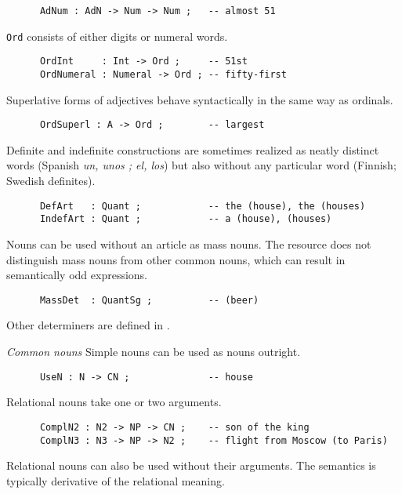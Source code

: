 \documentclass[11pt,a4paper]{article}
\newcommand{\subsubsubsection}[1]{\textit{#1}}
\begin{document}
\begin{verbatim}
      AdNum : AdN -> Num -> Num ;   -- almost 51
\end{verbatim}

\texttt{Ord} consists of either digits or numeral words.

\begin{verbatim}
      OrdInt     : Int -> Ord ;     -- 51st
      OrdNumeral : Numeral -> Ord ; -- fifty-first
\end{verbatim}

Superlative forms of adjectives behave syntactically in the same way as
ordinals.

\begin{verbatim}
      OrdSuperl : A -> Ord ;        -- largest
\end{verbatim}

Definite and indefinite constructions are sometimes realized as
neatly distinct words (Spanish \textit{un, unos ; el, los}) but also without
any particular word (Finnish; Swedish definites).

\begin{verbatim}
      DefArt   : Quant ;            -- the (house), the (houses)
      IndefArt : Quant ;            -- a (house), (houses)
\end{verbatim}

Nouns can be used without an article as mass nouns. The resource does
not distinguish mass nouns from other common nouns, which can result
in semantically odd expressions.

\begin{verbatim}
      MassDet  : QuantSg ;          -- (beer)
\end{verbatim}

Other determiners are defined in .

\subsubsubsection{Common nouns}
Simple nouns can be used as nouns outright.

\begin{verbatim}
      UseN : N -> CN ;              -- house
\end{verbatim}

Relational nouns take one or two arguments.

\begin{verbatim}
      ComplN2 : N2 -> NP -> CN ;    -- son of the king
      ComplN3 : N3 -> NP -> N2 ;    -- flight from Moscow (to Paris)
\end{verbatim}

Relational nouns can also be used without their arguments.
The semantics is typically derivative of the relational meaning.
\end{document}
